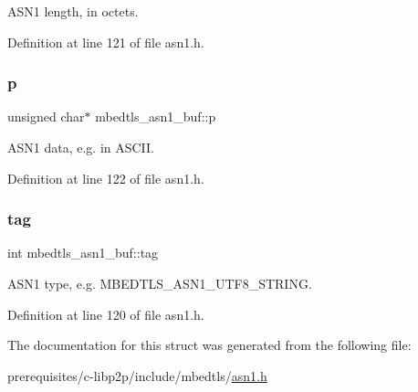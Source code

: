 A\+S\+N1 length, in octets. 

Definition at line 121 of file asn1.\+h.

\mbox{\label{structmbedtls__asn1__buf_a0af0cf9b0801a21ce4652e859876f195}} 
\subsubsection{\texorpdfstring{p}{p}}
{\footnotesize\ttfamily unsigned char$\ast$ mbedtls\+\_\+asn1\+\_\+buf\+::p}

A\+S\+N1 data, e.\+g. in A\+S\+C\+II. 

Definition at line 122 of file asn1.\+h.

\mbox{\label{structmbedtls__asn1__buf_abcca2df9a773acd5b59831ac55993dd1}} 
\subsubsection{\texorpdfstring{tag}{tag}}
{\footnotesize\ttfamily int mbedtls\+\_\+asn1\+\_\+buf\+::tag}

A\+S\+N1 type, e.\+g. M\+B\+E\+D\+T\+L\+S\+\_\+\+A\+S\+N1\+\_\+\+U\+T\+F8\+\_\+\+S\+T\+R\+I\+NG. 

Definition at line 120 of file asn1.\+h.



The documentation for this struct was generated from the following file\+:\begin{DoxyCompactItemize}
\item 
prerequisites/c-\/libp2p/include/mbedtls/\mbox{\hyperlink{asn1_8h}{asn1.\+h}}\end{DoxyCompactItemize}
